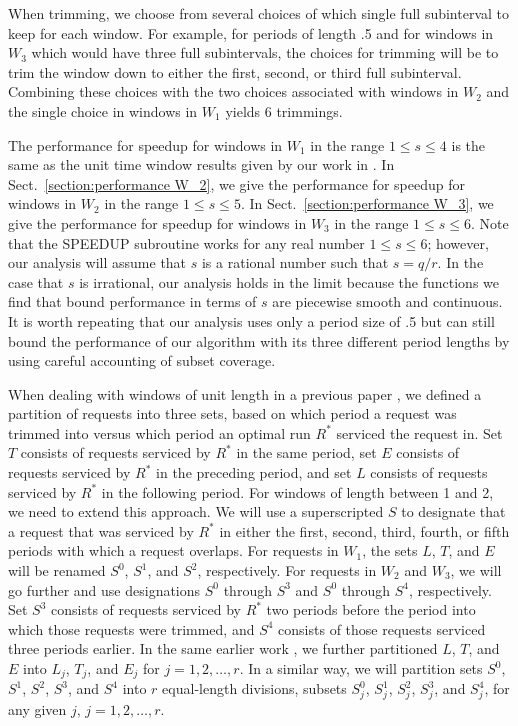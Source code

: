 \documentclass[11pt]{article}
\begin{document}
When trimming, we choose from several choices of which single full subinterval to keep for each window.  For example, for periods of length .5 and for windows in $W_3$ which would have three full subintervals, the choices for trimming will be to trim the window down to either the first, second, or third full subinterval.  Combining these choices with the two choices associated with windows in $W_2$ and the single choice in windows in $W_1$ yields 6 trimmings.

The performance for speedup for windows in $W_1$ in the range $1 \leq s \leq 4$ is the same as the unit time window results given by our work in \cite{Frederickson5}.  In Sect.~\ref{section:performance W_2}, we give the performance for speedup for windows in $W_2$ in the range $1 \leq s \leq 5$.  In Sect.~\ref{section:performance W_3}, we give the performance for speedup for windows in $W_3$ in the range $1 \leq s \leq 6$.  Note that the SPEEDUP subroutine works for any real number $1 \leq s \leq 6$; however, our analysis will assume that $s$ is a rational number such that $s = q/r$.  In the case that $s$ is irrational, our analysis holds in the limit because the functions we find that bound performance in terms of $s$ are piecewise smooth and continuous.  It is worth repeating that our analysis uses only a period size of .5 but can still bound the performance of our algorithm with its three different period lengths by using careful accounting of subset coverage.


When dealing with windows of unit length in a previous paper \cite{Frederickson5}, we defined a partition of requests into three sets, based on which period a request was trimmed into versus which period an optimal run $R^*$ serviced the request in. Set $T$ consists of requests serviced by $R^*$ in the same period, set $E$ consists of requests serviced by $R^*$ in the preceding period, and set $L$ consists of requests serviced by $R^*$ in the following period.  For windows of length between 1 and 2, we need to extend this approach.  We will use a superscripted $S$ to designate that a request that was serviced by $R^*$ in either the first, second, third, fourth, or fifth periods with which a request overlaps.
For requests in $W_1$, the sets $L$, $T$, and $E$ will be renamed $S^0$, $S^1$, and $S^2$, respectively.  For requests in $W_2$ and $W_3$, we will go further and use designations $S^0$ through $S^3$ and $S^0$ through $S^4$, respectively. Set $S^3$ consists of requests serviced by $R^*$ two periods before the period into which those requests were trimmed, and $S^4$ consists of those requests serviced three periods earlier.
In the same earlier work \cite{Frederickson5}, we further partitioned $L$, $T$, and $E$ into $L_j$, $T_j$, and $E_j$ for $j = 1, 2, \ldots, r$.
In a similar way, we will partition sets $S^0$, $S^1$, $S^2$, $S^3$, and $S^4$ into $r$ equal-length divisions, subsets $S^0_j$, $S^1_j$, $S^2_j$, $S^3_j$, and $S^4_j$, for any given $j$, $j = 1, 2, \ldots, r$.
\end{document}
